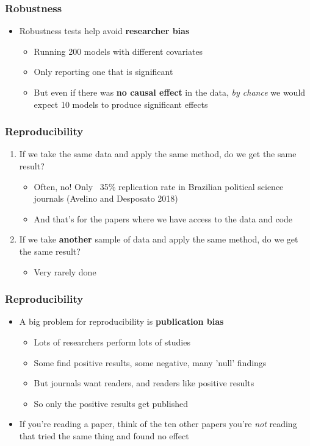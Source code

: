 \documentclass[xcolor=x11names,compress]{beamer}\usepackage[]{graphicx}\usepackage[]{color}
\renewcommand{\(}{\begin{columns}}
\renewcommand{\)}{\end{columns}}
\newcommand{\<}[1]{\begin{column}{#1}}
\renewcommand{\>}{\end{column}}
\begin{document}
\begin{frame}
\frametitle{Robustness}
\begin{itemize}
\item Robustness tests help avoid \textbf{researcher bias}
\pause
\begin{itemize}
\item Running 200 models with different covariates
\pause
\item Only reporting one that is significant
\pause
\item But even if there was \textbf{no causal effect} in the data, \textit{by chance} we would expect 10 models to produce significant effects
\end{itemize}
\end{itemize}
\end{frame}


\begin{frame}
\frametitle{Reproducibility}
\begin{enumerate}
\item If we take the same data and apply the same method, do we get the same result?
\pause
\begin{itemize}
\item Often, no! Only ~35\% replication rate in Brazilian political science journals (Avelino and Desposato 2018)
\pause
\item And that's for the papers where we have access to the data and code
\pause
\end{itemize}
\item If we take \textbf{another} sample of data and apply the same method, do we get the same result?
\begin{itemize}
\item Very rarely done
\end{itemize}
\end{enumerate}
\end{frame}

\begin{frame}
\frametitle{Reproducibility}
\begin{itemize}
\item A big problem for reproducibility is \textbf{publication bias}
\pause
\begin{itemize}
\item Lots of researchers perform lots of studies
\pause
\item Some find positive results, some negative, many 'null' findings
\pause
\item But journals want readers, and readers like positive results
\pause
\item So only the positive results get published
\pause
\end{itemize}
\item If you're reading a paper, think of the ten other papers you're \textit{not} reading that tried the same thing and found no effect
\end{itemize}
\end{frame}
\end{document}
